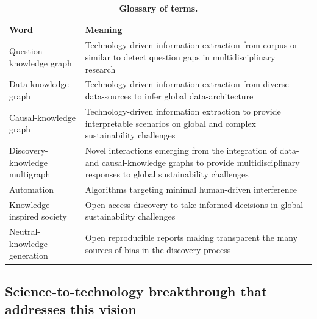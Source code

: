 \documentclass[12pt, a4paper]{article} %
\begin{document}
   
\begin{table}[ht]
\begin{tabular}{ p{6cm} | p{11cm}}
  \hline \hline
  \textbf{Word} &\textbf{Meaning}\\  \hline
  Question-knowledge graph & Technology-driven information extraction from corpus or similar to detect question gaps in multidisciplinary research\\ \hline
  Data-knowledge graph & Technology-driven information extraction from diverse data-sources to infer global data-architecture \\ \hline
  Causal-knowledge graph & Technology-driven information extraction to provide interpretable scenarios on global and complex sustainability challenges\\ \hline
  Discovery-knowledge multigraph & Novel interactions emerging from the integration of data- and causal-knowledge graphs to provide multidisciplinary responses to global sustainability challenges\\ \hline
  Automation & Algorithms targeting minimal human-driven interference\\ \hline
  Knowledge-inspired society & Open-access discovery to take informed decisions in global sustainability challenges \\ \hline
  Neutral-knowledge generation & Open reproducible reports making transparent the many sources of bias in the discovery process\\ \hline
  \bottomrule
\end{tabular}
\caption{{\bf Glossary of terms.}}
\end{table}

\subsection{Science-to-technology breakthrough that addresses this vision}
\end{document}
